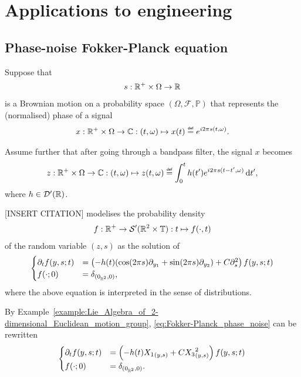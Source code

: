 \section{Applications to engineering}

\subsection{Phase-noise Fokker-Planck equation}

Suppose that
\begin{align*}
    s : \mathbb{R}^+ \times \Omega \to \mathbb{R}
\end{align*}
is a Brownian motion on a probability space $(\Omega, \mathcal F, \mathbb P)$
that represents the (normalised) phase of a signal
\begin{align*}
    x : \R^+ \times \Omega \to \C : (t, \omega) \mapsto x(t) \defeq \e^{\i \turn s(t, \omega)}.
\end{align*}

Assume further that after going through a bandpass filter,
the signal $x$ becomes
\begin{align*}
    z : \R^+ \times \Omega \to \C : (t, \omega) \mapsto z(t, \omega) \defeq \int_0^t h(t') \e^{\i \turn s(t - t', \omega)} \dd t',
\end{align*}
where $h \in {\mathcal{D}' (\mathbb{R})}$.

[INSERT CITATION] modelises the probability density
\begin{align*}
    f : \mathbb{R}^+ \to {\mathcal{S}' (\mathbb{R}^2 \times \mathbb{T})} : t \mapsto f(\cdot, t)
\end{align*}
of the random variable $(z, s)$ as the solution of
\begin{align}
    \begin{cases}
        \D{1}[f]{t}(y, s; t) &= \left(-h(t) (\cos (\turn s) \D{1}{{y_1} } + \sin(\turn s) \D{1}{{y_2} }) + C \D{2}{s^2}\right) f(y, s; t)\\
        f(\dummy; 0) &= \DiracDelta{(0_{\R^2}, 0)},
    \end{cases}
    \label{eq:Fokker-Planck_phase_noise}
\end{align}
where the above equation is interpreted in the sense of distributions.

By Example~\ref{example:Lie_Algebra_of_2-dimensional_Euclidean_motion_group},
\eqref{eq:Fokker-Planck_phase_noise} can be rewritten
\begin{align}
    \begin{cases}
        \D{1}[f]{t}(y, s; t) &= \left(-h(t) \LeftDifferentialOperatorFirstOrder {X_1}_{(y, s)} + C \LeftDifferentialOperatorFirstOrder {X_3}^2_{(y, s)}\right) f(y, s; t)\\
        f(\dummy; 0) &= \DiracDelta{(0_{\R^2}, 0)}.
    \end{cases}
    \label{eq:Fokker-Planck_phase_noise:left-invariant_operators}
\end{align}

